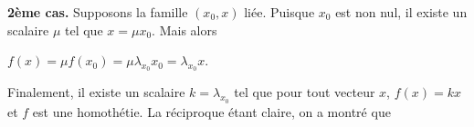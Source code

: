 {{ 
\textbf{2ème cas.} Supposons la famille $(x_0,x)$ liée. Puisque $x_0$ est non nul, il existe un scalaire $\mu$ tel que $x =\mu x_0$. Mais alors 

\begin{center}
$f(x) =\mu f(x_0)=\mu \lambda_{x_0}x_0 =\lambda_{x_0}x$.
\end{center}

Finalement, il existe un scalaire $k=\lambda_{x_0}$ tel que pour tout vecteur $x$, $f(x) =kx$ et $f$ est une homothétie. La réciproque étant claire, on a montré que

\begin{center}
\end{center}
}
}
